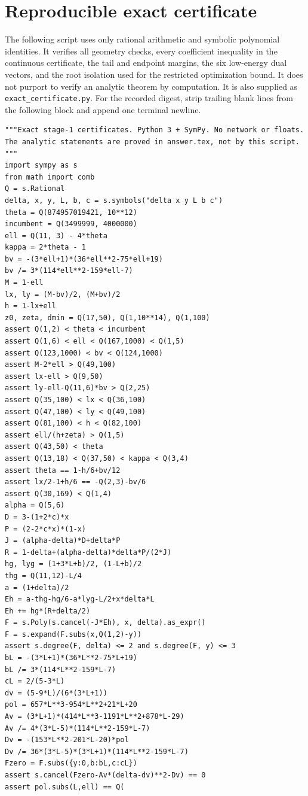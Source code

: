 \documentclass[12pt]{article}
\begin{document}
\section{Reproducible exact certificate}\label{app:certificate-code}
The following script uses only rational arithmetic and symbolic
polynomial identities.  It verifies all geometry checks, every
coefficient inequality in the continuous certificate, the tail
and endpoint margins, the six low-energy dual vectors, and the
root isolation used for the restricted optimization bound.
It does not purport to verify an analytic theorem by computation.
It is also supplied as \texttt{exact\_certificate.py}.
For the recorded digest, strip trailing blank lines from the following
block and append one terminal newline.
\begin{verbatim}
"""Exact stage-1 certificates. Python 3 + SymPy. No network or floats.
The analytic statements are proved in answer.tex, not by this script.
"""
import sympy as s
from math import comb
Q = s.Rational
delta, x, y, L, b, c = s.symbols("delta x y L b c")
theta = Q(874957019421, 10**12)
incumbent = Q(3499999, 4000000)
ell = Q(11, 3) - 4*theta
kappa = 2*theta - 1
bv = -(3*ell+1)*(36*ell**2-75*ell+19)
bv /= 3*(114*ell**2-159*ell-7)
M = 1-ell
lx, ly = (M-bv)/2, (M+bv)/2
h = 1-lx+ell
z0, zeta, dmin = Q(17,50), Q(1,10**14), Q(1,100)
assert Q(1,2) < theta < incumbent
assert Q(1,6) < ell < Q(167,1000) < Q(1,5)
assert Q(123,1000) < bv < Q(124,1000)
assert M-2*ell > Q(49,100)
assert lx-ell > Q(9,50)
assert ly-ell-Q(11,6)*bv > Q(2,25)
assert Q(35,100) < lx < Q(36,100)
assert Q(47,100) < ly < Q(49,100)
assert Q(81,100) < h < Q(82,100)
assert ell/(h+zeta) > Q(1,5)
assert Q(43,50) < theta
assert Q(13,18) < Q(37,50) < kappa < Q(3,4)
assert theta == 1-h/6+bv/12
assert lx/2-1+h/6 == -Q(2,3)-bv/6
assert Q(30,169) < Q(1,4)
alpha = Q(5,6)
D = 3-(1+2*c)*x
P = (2-2*c*x)*(1-x)
J = (alpha-delta)*D+delta*P
R = 1-delta+(alpha-delta)*delta*P/(2*J)
hg, lyg = (1+3*L+b)/2, (1-L+b)/2
thg = Q(11,12)-L/4
a = (1+delta)/2
Eh = a-thg-hg/6-a*lyg-L/2+x*delta*L
Eh += hg*(R+delta/2)
F = s.Poly(s.cancel(-J*Eh), x, delta).as_expr()
F = s.expand(F.subs(x,Q(1,2)-y))
assert s.degree(F, delta) <= 2 and s.degree(F, y) <= 3
bL = -(3*L+1)*(36*L**2-75*L+19)
bL /= 3*(114*L**2-159*L-7)
cL = 2/(5-3*L)
dv = (5-9*L)/(6*(3*L+1))
pol = 657*L**3-954*L**2+21*L+20
Av = (3*L+1)*(414*L**3-1191*L**2+878*L-29)
Av /= 4*(3*L-5)*(114*L**2-159*L-7)
Dv = -(153*L**2-201*L-20)*pol
Dv /= 36*(3*L-5)*(3*L+1)*(114*L**2-159*L-7)
Fzero = F.subs({y:0,b:bL,c:cL})
assert s.cancel(Fzero-Av*(delta-dv)**2-Dv) == 0
assert pol.subs(L,ell) == Q(

\end{verbatim}
\end{document}
